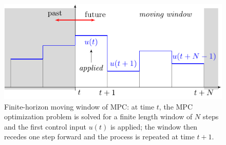 \begin{figure}
\centering
\includegraphics[scale=0.85]{Figures/receding_horizon.pdf}
\caption{Finite-horizon moving window of MPC: at time $t$, the MPC optimization problem is solved for a finite length window of $N$ steps and the first control input $u(t)$ is applied; the window then recedes one step forward and the process is repeated at time $t+1$.}
\captionsetup{justification=centering}
\label{F:MPC-illust}
\end{figure} 


